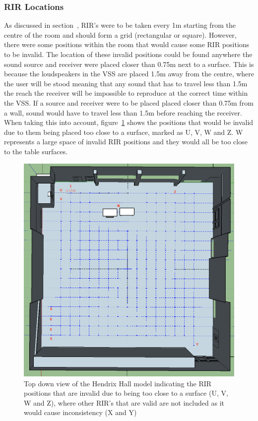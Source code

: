 \documentclass[../../main.tex]{subfiles}
\begin{document}
		\subsubsection{RIR Locations}
		\label{rirlocations}
			As discussed in section~, \ac{RIR}'s were to be taken every 1m starting from the centre of the room and should form a grid (rectangular or square). However, there were some positions within the room that would cause some \ac{RIR} positions to be invalid. The location of these invalid positions could be found anywhere the sound source and receiver were placed closer than 0.75m next to a surface. This is because the loudspeakers in the \ac{VSS} are placed 1.5m away from the centre, where the user will be stood meaning that any sound that has to travel less than 1.5m the reach the receiver will be impossible to reproduce at the correct time within the \ac{VSS}. If a source and receiver were to be placed placed closer than 0.75m from a wall, sound would have to travel less than 1.5m before reaching the receiver. When taking this into account, figure~\ref{incorrectRIRPositions} shows the positions that would be invalid due to them being placed too close to a surface, marked as U, V, W and Z. W represents a large space of invalid \ac{RIR} positions and they would all be too close to the table surfaces.

			\begin{figure}[H]
				\centerline{\includegraphics[scale = 0.4]{Sections/Implementation/Odeon/images/RIRPositions/RIRPositionAnnotated.png}}
				\caption{Top down view of the Hendrix Hall model indicating the \ac{RIR} positions that are invalid due to being too close to a surface (U, V, W and Z), where other \ac{RIR}'s that are valid are not included as it would cause inconsistency (X and Y)}
				\label{incorrectRIRPositions}
			\end{figure}
\end{document}
